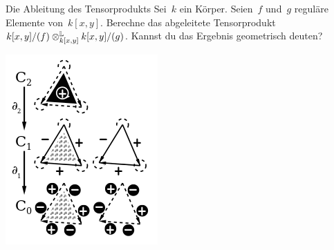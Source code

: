 \documentclass{uebblatt}
\begin{document}
\begin{aufgabe}{Die Ableitung des Tensorprodukts}
Sei~$k$ ein Körper. Seien~$f$ und~$g$ reguläre Elemente von~$k[x,y]$.
Berechne das abgeleitete Tensorprodukt~$k[x,y]/(f) \otimes_{k[x,y]}^{\mathbb{L}}
k[x,y]/(g)$. Kannst du das Ergebnis geometrisch deuten?
\end{aufgabe}

\vfill
\centering
\href{https://en.wikipedia.org/wiki/Simplicial_homology}{\includegraphics[scale=0.4]{images/simplicial-homology}}
\par
\end{document}
